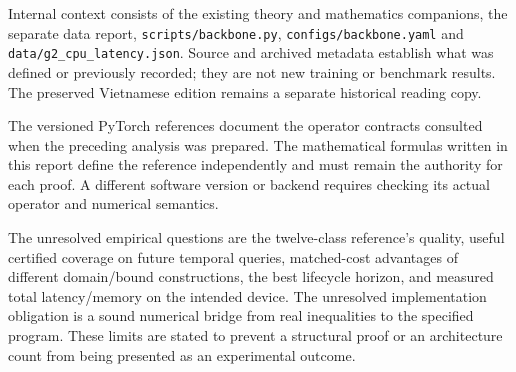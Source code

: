 \documentclass[11pt,a4paper]{article}
\newcommand{\code}[1]{{\small\ttfamily\nolinkurl{#1}}}
\begin{document}
Internal context consists of the existing theory and mathematics companions, the separate data report, \code{scripts/backbone.py}, \code{configs/backbone.yaml} and \code{data/g2_cpu_latency.json}. Source and archived metadata establish what was defined or previously recorded; they are not new training or benchmark results. The preserved Vietnamese edition remains a separate historical reading copy.

The versioned PyTorch references document the operator contracts consulted when the preceding analysis was prepared. The mathematical formulas written in this report define the reference independently and must remain the authority for each proof. A different software version or backend requires checking its actual operator and numerical semantics.

The unresolved empirical questions are the twelve-class reference's quality, useful certified coverage on future temporal queries, matched-cost advantages of different domain/bound constructions, the best lifecycle horizon, and measured total latency/memory on the intended device. The unresolved implementation obligation is a sound numerical bridge from real inequalities to the specified program. These limits are stated to prevent a structural proof or an architecture count from being presented as an experimental outcome.
\end{document}
